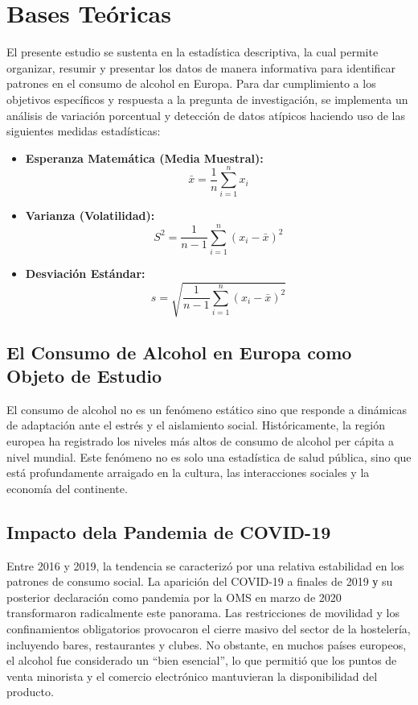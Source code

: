 \documentclass[
]{article}
\begin{document}
\section{Bases Teóricas}

El presente estudio se sustenta en la estadística descriptiva, la cual
permite organizar, resumir y presentar los datos de manera informativa
para identificar patrones en el consumo de alcohol en Europa. Para dar
cumplimiento a los objetivos específicos y respuesta a la pregunta de
investigación, se implementa un análisis de variación porcentual y
detección de datos atípicos haciendo uso de las siguientes medidas
estadísticas:

\begin{itemize}
\item
  \textbf{Esperanza Matemática (Media Muestral):}
  \[\bar{x} = \frac{1}{n} \sum_{i=1}^{n} x_i\]
\item
  \textbf{Varianza (Volatilidad):}
  \[S^2 = \frac{1}{n-1} \sum_{i=1}^{n} (x_i - \bar{x})^2\]
\item
  \textbf{Desviación Estándar:}
  \[s = \sqrt{\frac{1}{n-1} \sum_{i=1}^{n} (x_i - \bar{x})^2}\]
\end{itemize}

\subsection{El Consumo de Alcohol en Europa como Objeto de Estudio}

El consumo de alcohol no es un fenómeno estático sino que responde a
dinámicas de adaptación ante el estrés y el aislamiento social.
Históricamente, la región europea ha registrado los niveles más altos de
consumo de alcohol per cápita a nivel mundial. Este fenómeno no es solo
una estadística de salud pública, sino que está profundamente arraigado
en la cultura, las interacciones sociales y la economía del
continente.\\

\subsection{Impacto dela Pandemia de COVID-19}

Entre 2016 y 2019, la tendencia se caracterizó por una relativa
estabilidad en los patrones de consumo social. La aparición del COVID-19
a finales de 2019 у su posterior declaración como pandemia por la OMS en
marzo de 2020 transformaron radicalmente este panorama. Las
restricciones de movilidad y los confinamientos obligatorios provocaron
el cierre masivo del sector de la hostelería, incluyendo bares,
restaurantes y clubes. No obstante, en muchos países europeos, el
alcohol fue considerado un ``bien esencial'', lo que permitió que los
puntos de venta minorista y el comercio electrónico mantuvieran la
disponibilidad del producto.\\
\end{document}
